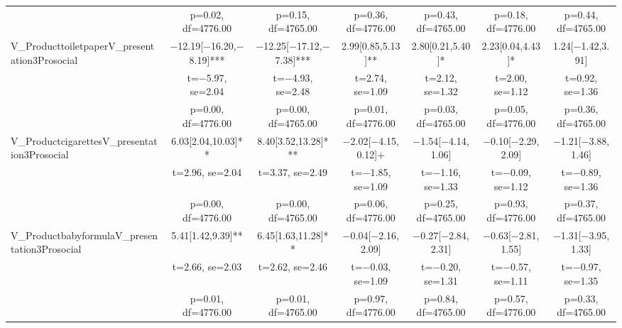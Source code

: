 \documentclass[]{report}
\begin{document}
\begin{table}
{\begin{tabular}[t]{lcccccc}
		& p=\num{0.02}, df=\num{4776.00} & p=\num{0.15}, df=\num{4765.00} & p=\num{0.36}, df=\num{4776.00} & p=\num{0.43}, df=\num{4765.00} & p=\num{0.18}, df=\num{4776.00} & p=\num{0.44}, df=\num{4765.00}\\
		V\_ProducttoiletpaperV\_presentation3Prosocial & \num{-12.19}[\num{-16.20},\num{-8.19}]*** & \num{-12.25}[\num{-17.12},\num{-7.38}]*** & \num{2.99}[\num{0.85},\num{5.13}]** & \num{2.80}[\num{0.21},\num{5.40}]* & \num{2.23}[\num{0.04},\num{4.43}]* & \num{1.24}[\num{-1.42},\num{3.91}]\\
		& t=\num{-5.97}, se=\num{2.04} & t=\num{-4.93}, se=\num{2.48} & t=\num{2.74}, se=\num{1.09} & t=\num{2.12}, se=\num{1.32} & t=\num{2.00}, se=\num{1.12} & t=\num{0.92}, se=\num{1.36}\\
		& p=\num{0.00}, df=\num{4776.00} & p=\num{0.00}, df=\num{4765.00} & p=\num{0.01}, df=\num{4776.00} & p=\num{0.03}, df=\num{4765.00} & p=\num{0.05}, df=\num{4776.00} & p=\num{0.36}, df=\num{4765.00}\\
		V\_ProductcigarettesV\_presentation3Prosocial & \num{6.03}[\num{2.04},\num{10.03}]** & \num{8.40}[\num{3.52},\num{13.28}]*** & \num{-2.02}[\num{-4.15},\num{0.12}]+ & \num{-1.54}[\num{-4.14},\num{1.06}] & \num{-0.10}[\num{-2.29},\num{2.09}] & \num{-1.21}[\num{-3.88},\num{1.46}]\\
		& t=\num{2.96}, se=\num{2.04} & t=\num{3.37}, se=\num{2.49} & t=\num{-1.85}, se=\num{1.09} & t=\num{-1.16}, se=\num{1.33} & t=\num{-0.09}, se=\num{1.12} & t=\num{-0.89}, se=\num{1.36}\\
		& p=\num{0.00}, df=\num{4776.00} & p=\num{0.00}, df=\num{4765.00} & p=\num{0.06}, df=\num{4776.00} & p=\num{0.25}, df=\num{4765.00} & p=\num{0.93}, df=\num{4776.00} & p=\num{0.37}, df=\num{4765.00}\\
		V\_ProductbabyformulaV\_presentation3Prosocial & \num{5.41}[\num{1.42},\num{9.39}]** & \num{6.45}[\num{1.63},\num{11.28}]** & \num{-0.04}[\num{-2.16},\num{2.09}] & \num{-0.27}[\num{-2.84},\num{2.31}] & \num{-0.63}[\num{-2.81},\num{1.55}] & \num{-1.31}[\num{-3.95},\num{1.33}]\\
		& t=\num{2.66}, se=\num{2.03} & t=\num{2.62}, se=\num{2.46} & t=\num{-0.03}, se=\num{1.09} & t=\num{-0.20}, se=\num{1.31} & t=\num{-0.57}, se=\num{1.11} & t=\num{-0.97}, se=\num{1.35}\\
		& p=\num{0.01}, df=\num{4776.00} & p=\num{0.01}, df=\num{4765.00} & p=\num{0.97}, df=\num{4776.00} & p=\num{0.84}, df=\num{4765.00} & p=\num{0.57}, df=\num{4776.00} & p=\num{0.33}, df=\num{4765.00}\\

\end{tabular}}
\end{table}
\end{document}
